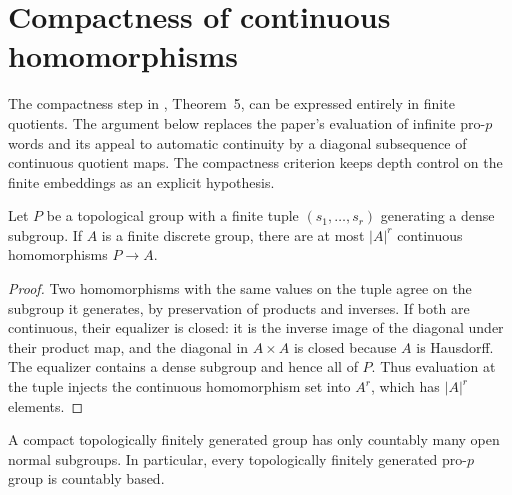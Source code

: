 \section{Compactness of continuous homomorphisms}

The compactness step in \cite{Camina1997}, Theorem~5, can be expressed
entirely in finite quotients. The argument below replaces the paper's
evaluation of infinite pro-$p$ words and its appeal to automatic
continuity by a diagonal subsequence of continuous quotient maps.
The compactness criterion keeps depth control on the finite embeddings
as an explicit hypothesis.

\begin{lemma}
\label{lem:finite-continuous-hom-set}
\leanok
Let $P$ be a topological group with a finite tuple
$(s_1,\ldots,s_r)$ generating a dense subgroup. If $A$ is a finite
discrete group, there are at most $|A|^r$ continuous homomorphisms
$P\to A$.
\end{lemma}

\begin{proof}
Two homomorphisms with the same values on the tuple agree on the
subgroup it generates, by preservation of products and inverses.
If both are continuous, their equalizer is closed: it is the
inverse image of the diagonal under their product map, and the
diagonal in $A\times A$ is closed because $A$ is Hausdorff.
The equalizer contains a dense subgroup and hence all of $P$.
Thus evaluation at the tuple injects the continuous homomorphism
set into $A^r$, which has $|A|^r$ elements.
\end{proof}

\begin{lemma}
\label{lem:finitely-generated-pro-p-countable-base}
\leanok
A compact topologically finitely generated group has only countably
many open normal subgroups. In particular, every topologically
finitely generated pro-$p$ group is countably based.
\end{lemma}

